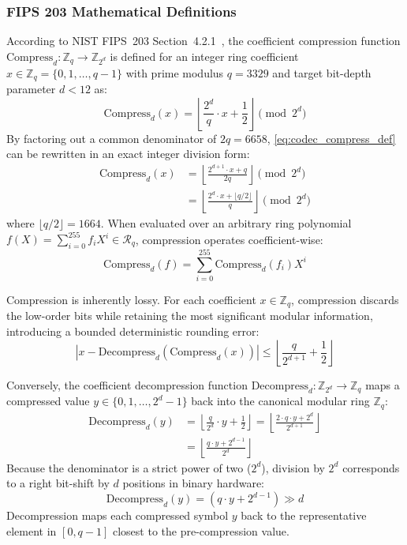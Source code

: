 \subsubsection{FIPS 203 Mathematical Definitions}
According to NIST FIPS~203 Section~4.2.1~\cite{fips203}, the coefficient compression function $\text{Compress}_d: \mathbb{Z}_q \to \mathbb{Z}_{2^d}$ is defined for an integer ring coefficient $x \in \mathbb{Z}_q = \{0, 1, \dots, q-1\}$ with prime modulus $q = 3329$ and target bit-depth parameter $d < 12$ as:
\begin{equation}
\label{eq:codec_compress_def}
\text{Compress}_d(x) = \left\lfloor \frac{2^d}{q} \cdot x + \frac{1}{2} \right\rfloor \pmod{2^d}
\end{equation}
By factoring out a common denominator of $2q = 6658$, \eqref{eq:codec_compress_def} can be rewritten in an exact integer division form:
\begin{align}
\label{eq:codec_compress_integer}
\text{Compress}_d(x) &= \left\lfloor \frac{2^{d+1} \cdot x + q}{2q} \right\rfloor \pmod{2^d} \nonumber \\
&= \left\lfloor \frac{2^d \cdot x + \lfloor q/2 \rfloor}{q} \right\rfloor \pmod{2^d}
\end{align}
where $\lfloor q/2 \rfloor = 1664$. When evaluated over an arbitrary ring polynomial $f(X) = \sum_{i=0}^{255} f_i X^i \in \mathcal{R}_q$, compression operates coefficient-wise:
\begin{equation}
\label{eq:codec_compress_poly}
\text{Compress}_d(f) = \sum_{i=0}^{255} \text{Compress}_d(f_i) X^i
\end{equation}

Compression is inherently lossy. For each coefficient $x \in \mathbb{Z}_q$, compression discards the low-order bits while retaining the most significant modular information, introducing a bounded deterministic rounding error:
\begin{equation}
\label{eq:codec_compress_error_bound}
\left| x - \text{Decompress}_d(\text{Compress}_d(x)) \right| \le \left\lfloor \frac{q}{2^{d+1}} + \frac{1}{2} \right\rfloor
\end{equation}

Conversely, the coefficient decompression function $\text{Decompress}_d: \mathbb{Z}_{2^d} \to \mathbb{Z}_q$ maps a compressed value $y \in \{0, 1, \dots, 2^d - 1\}$ back into the canonical modular ring $\mathbb{Z}_q$:
\begin{align}
\label{eq:codec_decompress_def}
\text{Decompress}_d(y) &= \left\lfloor \frac{q}{2^d} \cdot y + \frac{1}{2} \right\rfloor = \left\lfloor \frac{2 \cdot q \cdot y + 2^d}{2^{d+1}} \right\rfloor \nonumber \\
&= \left\lfloor \frac{q \cdot y + 2^{d-1}}{2^d} \right\rfloor
\end{align}
Because the denominator is a strict power of two ($2^d$), division by $2^d$ corresponds to a right bit-shift by $d$ positions in binary hardware:
\begin{equation}
\label{eq:codec_decompress_shift}
\text{Decompress}_d(y) = \left( q \cdot y + 2^{d-1} \right) \gg d
\end{equation}
Decompression maps each compressed symbol $y$ back to the representative element in $[0, q-1]$ closest to the pre-compression value.

